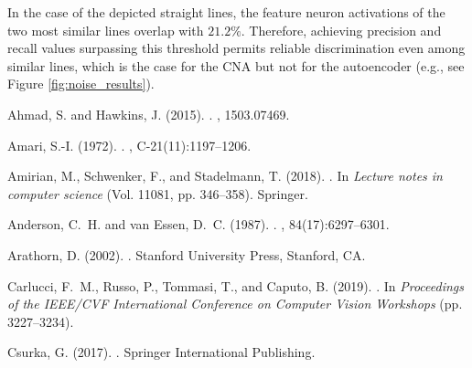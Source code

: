 \documentclass[12pt]{article}
\begin{document}
In the case of the depicted straight lines, the feature neuron activations of the two most similar lines overlap with $21.2\%$. Therefore, achieving precision and recall values surpassing this threshold permits reliable discrimination even among similar lines, which is the case for the CNA but not for the autoencoder (e.g., see Figure \ref{fig:noise_results}).

\clearpage
\newpage

\begin{thebibliography}{}

Ahmad, S. and Hawkins, J. (2015).
.
, 1503.07469.

Amari, S.-I. (1972).
.
, C-21(11):1197--1206.

Amirian, M., Schwenker, F., and Stadelmann, T. (2018).
.
\newblock In {\em Lecture notes in computer science} (Vol. 11081, pp. 346–358). Springer.

Anderson, C.~H. and van Essen, D.~C. (1987).
.
, 84(17):6297--6301.

Arathorn, D. (2002).
.
\newblock Stanford University Press, Stanford, CA.

Carlucci, F.~M., Russo, P., Tommasi, T., and Caputo, B. (2019).
.
\newblock In {\em Proceedings of the IEEE/CVF International Conference on Computer Vision Workshops} (pp. 3227--3234).

Csurka, G. (2017).
.
\newblock Springer International Publishing.


\end{thebibliography}
\end{document}
